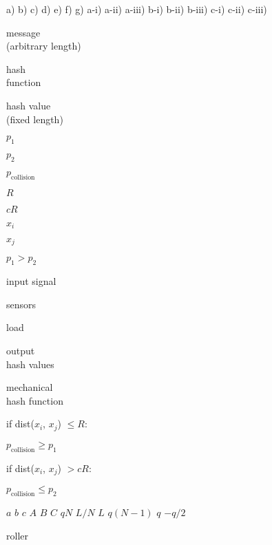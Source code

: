 \documentclass[a4paper,10pt]{article}
\begin{document}
\sffamily 


a) b) c) d) e) f) g) a-i) a-ii) a-iii) b-i) b-ii) b-iii) c-i) c-ii) c-iii)

\begin{center}
message\\
\vspace{-1mm}
(arbitrary length)
\end{center}

\begin{center}
hash\\
\vspace{-1mm}
function
\end{center}

\begin{center}
hash value\\
\vspace{-1mm}
(fixed length)
\end{center}

$p_1$

$p_2$

$p_{\mathrm{collision}}$

$R$

$cR$

$x_i$

$x_j$

$p_1 > p_2$

input signal

sensors

load

\begin{center}
output\\
\vspace{-1mm}
hash values
\end{center}

\begin{center}
mechanical\\
\vspace{-1mm}
hash function
\end{center}

\noindent if dist($x_i$, $x_j$) $\leq R$:

$p_{\mathrm{collision}} \geq p_1$


\noindent if dist($x_i$, $x_j$) $> cR$:

$p_{\mathrm{collision}} \leq p_2$

\bigskip

$a$ $b$ $c$ $A$ $B$ $C$ $qN$ $L/N$ $L$ $q(N-1)$ $q$ $-q/2$ 

roller




%
%
\end{document}

